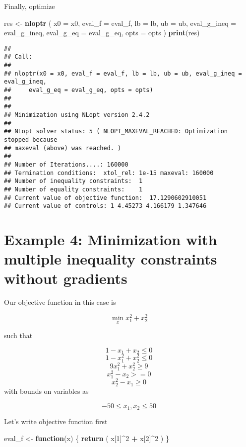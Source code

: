 \documentclass[onecolumn]{article}
\newenvironment{Shaded}{\begin{snugshade}}{\end{snugshade}}
\newcommand{\KeywordTok}[1]{\textcolor[rgb]{0.13,0.29,0.53}{\textbf{#1}}}
\newcommand{\DataTypeTok}[1]{\textcolor[rgb]{0.13,0.29,0.53}{#1}}
\newcommand{\DecValTok}[1]{\textcolor[rgb]{0.00,0.00,0.81}{#1}}
\newcommand{\StringTok}[1]{\textcolor[rgb]{0.31,0.60,0.02}{#1}}
\newcommand{\ControlFlowTok}[1]{\textcolor[rgb]{0.13,0.29,0.53}{\textbf{#1}}}
\newcommand{\OperatorTok}[1]{\textcolor[rgb]{0.81,0.36,0.00}{\textbf{#1}}}
\newcommand{\NormalTok}[1]{#1}
\begin{document}
Finally, optimize

\begin{Shaded}
\begin{Highlighting}[]
\NormalTok{res <-}\StringTok{ }\KeywordTok{nloptr}\NormalTok{ ( }\DataTypeTok{x0 =}\NormalTok{ x0,}
                \DataTypeTok{eval_f =}\NormalTok{ eval_f,}
                \DataTypeTok{lb =}\NormalTok{ lb,}
                \DataTypeTok{ub =}\NormalTok{ ub,}
                \DataTypeTok{eval_g_ineq =}\NormalTok{ eval_g_ineq,}
                \DataTypeTok{eval_g_eq =}\NormalTok{ eval_g_eq,}
                \DataTypeTok{opts =}\NormalTok{ opts}
\NormalTok{)}
\KeywordTok{print}\NormalTok{(res)}
\end{Highlighting}
\end{Shaded}

\begin{verbatim}
## 
## Call:
## 
## nloptr(x0 = x0, eval_f = eval_f, lb = lb, ub = ub, eval_g_ineq = eval_g_ineq, 
##     eval_g_eq = eval_g_eq, opts = opts)
## 
## 
## Minimization using NLopt version 2.4.2 
## 
## NLopt solver status: 5 ( NLOPT_MAXEVAL_REACHED: Optimization stopped because 
## maxeval (above) was reached. )
## 
## Number of Iterations....: 160000 
## Termination conditions:  xtol_rel: 1e-15 maxeval: 160000 
## Number of inequality constraints:  1 
## Number of equality constraints:    1 
## Current value of objective function:  17.1290602910051 
## Current value of controls: 1 4.45273 4.166179 1.347646
\end{verbatim}

\section{Example 4: Minimization with multiple inequality constraints
without
gradients}\label{example-4-minimization-with-multiple-inequality-constraints-without-gradients}

Our objective function in this case is

\[
\min_{x} x_1^2 + x_2^2
\]

such that

\[
1- x_1 + x_2 \leq 0
\] \[
1- x_1^2 + x_2^2 \leq 0
\] \[
9x_1^2 + x_2^2 \geq 9
\] \[
x_1^2 -x_2 >=0
\] \[
x_2^2 - x_1 \geq 0
\] with bounds on variables as

\[
-50 \leq x_1, x_2 \leq 50
\]

Let's write objective function first

\begin{Shaded}
\begin{Highlighting}[]
\NormalTok{eval_f <-}\StringTok{ }\ControlFlowTok{function}\NormalTok{(x)}
\NormalTok{\{}
    \KeywordTok{return}\NormalTok{ ( x[}\DecValTok{1}\NormalTok{]}\OperatorTok{^}\DecValTok{2} \OperatorTok{+}\StringTok{ }\NormalTok{x[}\DecValTok{2}\NormalTok{]}\OperatorTok{^}\DecValTok{2}\NormalTok{ )}
\NormalTok{\}}
\end{Highlighting}
\end{Shaded}
\end{document}
